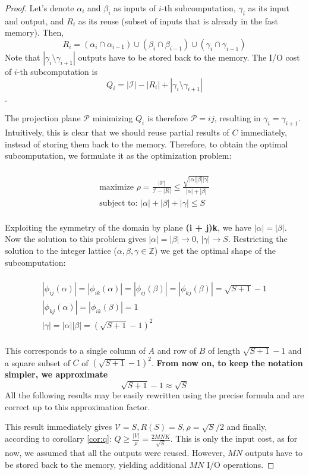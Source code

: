 \documentclass[sigplan,review,anonymous]{acmart}\settopmatter{printfolios=true,printccs=false,printacmref=false}
\begin{document}
\begin{proof}
Let's denote $\alpha_i$ and $\beta_i$ as inputs of $i$-th 
subcomputation, $\gamma_i$ as its input and output, and $R_i$ as its reuse 
(subset of inputs that is already in the fast memory). Then, 
$$R_i = (\alpha_i \cap \alpha_{i-1}) \cup (\beta_i \cap \beta_{i-1}) \cup 
(\gamma_i \cap \gamma_{i-1}) $$
Note that $|\gamma_i \setminus \gamma_{i+1}|$ outputs have to be stored back to 
the memory. The I/O cost of $i$-th subcomputation is 
$$Q_i = |\mathcal{I}| - |R_i| + |\gamma_i \setminus \gamma_{i+1}|$$.

The projection plane $\mathcal{P}$ minimizing $Q_i$ is therefore $\mathcal{P} = 
ij$, resulting in $\gamma_i = \gamma_{i+1}$. Intuitively, 
this is clear that we should reuse partial results of $C$ immediately, instead 
of storing them back to the memory. Therefore, to obtain the optimal 
subcomputation, we formulate it as the optimization problem:

\begin{multline}
\\
\text{maximize } \rho = \frac{|\mathcal{V}|}{\mathcal{I} - |R|} \le 
\frac{\sqrt{|\alpha| |\beta| |\gamma|}}{|\alpha| + |\beta|}\\
\text{subject to: } |\alpha| + |\beta| + |\gamma| \le S \\
\end{multline}

Exploiting the symmetry of the domain by plane \textbf{(i + j)k}, we have  
$|\alpha| = |\beta|$. Now the solution to this problem gives $|\alpha| = 
|\beta| \rightarrow 0$, $|\gamma| \rightarrow S$.  
Restricting the solution to the integer lattice ($\alpha, \beta, \gamma \in 
\mathbb{Z}$) we get the optimal shape of the subcomputation:

\begin{multline}
\label{eq:seqSolution}
\\
|\phi_{ij}(\alpha)| = |\phi_{ik}(\alpha)|  = |\phi_{ij}(\beta)| = 
|\phi_{kj}(\beta)|= \sqrt{S + 1} - 1 \\
|\phi_{kj}(\alpha)| = |\phi_{ik}(\beta)| = 1 \\
|\gamma| = |\alpha| |\beta| = (\sqrt{S + 1} - 1)^2 \\
\end{multline}

This corresponds to a single column of $A$ and row of $B$ of length $\sqrt{S + 
1} - 1$ and a square subset of $C$ of $(\sqrt{S + 1} - 1)^2$. \textbf{From now 
on, to 
keep the notation simpler, we approximate} 
\begin{equation}
\label{eq:approx}
\sqrt{S + 1} - 1 \approx \sqrt{S}
\end{equation}
All the following results may be easily rewritten using the precise formula and 
are correct up to this approximation factor.


This result immediately gives $\mathcal{V} = S, R(S) = S, \rho = 
\sqrt{S}/2$ and finally, according to corollary \ref{cor:q}:  $Q \ge 
\frac{|V|}{\rho} = 
\frac{2MNK}{\sqrt{S}}$. This is only the input cost, as for now, we assumed 
that all the outputs were reused. However, $MN$ outputs have to be stored back 
to the memory, yielding additional $MN$ I/O operations.
\end{proof}
\end{document}
